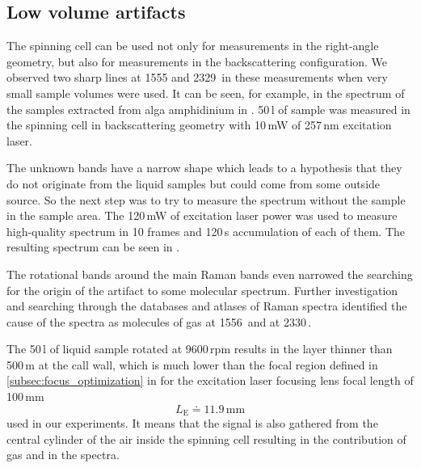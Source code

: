 \subsection{Low volume artifacts}

The spinning cell can be used not only for measurements in the right-angle
geometry, but also for measurements in the backscattering configuration.
We observed two sharp lines at 1555 and 2329\,\icm{} in these measurements
when very small sample volumes were used.
It can be seen, for example, in the spectrum of the samples extracted from alga
amphidinium in
.
50\,l of sample was measured in the spinning cell in backscattering
geometry with 10\,mW of 257\,nm excitation laser.

\begin{figure}
	\centering
	
	\caption[%
		Spectrum of extract from alga amphidinium in the spinning cell in
		backscattering geometry with 257\,nm excitation laser.%
	]{%
	}
	\label{\figlabel{artefact:artefact_amphidinium}}
\end{figure}

The unknown bands have a narrow shape which leads to a hypothesis that they
do not originate from the liquid samples but could come from some outside
source.
So the next step was to try to measure the spectrum without the sample in the
sample area.
The 120\,mW of excitation laser power was used to measure high-quality spectrum
in 10 frames and 120\,s accumulation of each of them.
The resulting spectrum can be seen in
.

\begin{figure}
	\centering
	
	\caption[%
		High-quality spectrum of the artifact.%
	]{%
	}
	\label{\figlabel{artifact:artifact}}
\end{figure}

The rotational bands around the main Raman bands even narrowed the searching
for the origin of the artifact to some molecular spectrum.
Further investigation and searching through the databases and atlases of
Raman spectra identified the cause of the spectra as molecules of gas 
at 1556\,\icm{} and  at 2330\,\icm{}.

The 50\,l of liquid sample rotated at 9600\,rpm results in the layer
thinner than 500\,m at the call wall, which is much lower than the focal
region defined in
\cref{subsec:focus_optimization}
in
for the excitation laser focusing lens focal length of 100\,mm
\begin{equation*}
L_\text{E} \doteq 11.9\,\text{mm}
\end{equation*}
used in our experiments.
It means that the signal is also gathered from the central cylinder of the air
inside the spinning cell resulting in the contribution of gas  and
 in the spectra.
